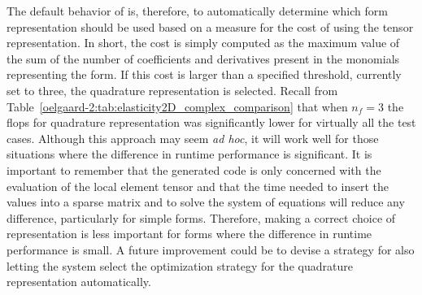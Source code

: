 The default behavior of \ffc{} is, therefore, to automatically
determine which form representation should be used based on a measure
for the cost of using the tensor representation.  In short, the cost
is simply computed as the maximum value of the sum of the number of
coefficients and derivatives present in the monomials representing
the form.  If this cost is larger than a specified threshold, currently
set to three, the quadrature representation is selected.  Recall from
Table~\ref{oelgaard-2:tab:elasticity2D_complex_comparison} that when
$n_f=3$ the flops for quadrature representation was significantly
lower for virtually all the test cases.  Although this approach may
seem \emph{ad hoc}, it will work well for those situations where the
difference in runtime performance is significant.  It is important to
remember that the generated code is only concerned with the evaluation
of the local element tensor and that the time needed to insert the values
into a sparse matrix and to solve the system of equations will reduce any
difference, particularly for simple forms.  Therefore, making a correct
choice of representation is less important for forms where the difference
in runtime performance is small.  A future improvement could be to devise
a strategy for also letting the system select the optimization strategy
for the quadrature representation automatically.

